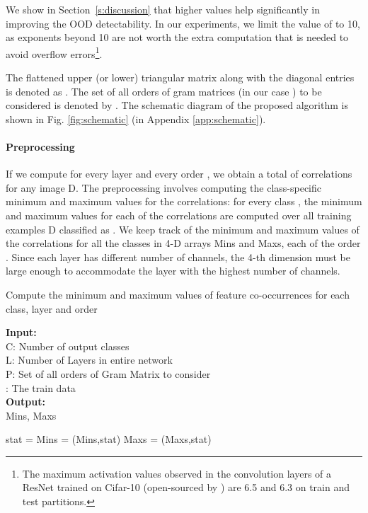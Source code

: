 \documentclass{article}
\begin{document}
We show in Section~\ref{s:discussion} that higher  values help significantly in improving the OOD detectability. In our experiments, we limit the value of  to 10, as exponents beyond 10 are not worth the extra computation that is needed to avoid overflow errors\footnote{The maximum activation values observed in the convolution layers of a ResNet trained on Cifar-10 (open-sourced by \cite{lee2018simple}) are 6.5 and 6.3 on train and test partitions.}.

The flattened upper (or lower) triangular matrix along with the diagonal entries is denoted as . The set of all orders of gram matrices (in our case ) to be considered is denoted by . The schematic diagram of the proposed algorithm is shown in Fig. \ref{fig:schematic} (in Appendix \ref{app:schematic}).



\paragraph{Preprocessing} If we compute  for every layer  and every order , we obtain a total of  correlations for any image D. The preprocessing involves computing the class-specific minimum and maximum values for the correlations: for every class , the minimum and maximum values for each of the  correlations are computed over all training examples D classified as . We keep track of the minimum and maximum values of the  correlations for all the classes in 4-D arrays Mins and Maxs, each of the order . Since each layer has different number of channels, the 4-th dimension must be large enough to accommodate the layer with the highest number of channels.

\begin{algorithm}[H]
\small
\caption{Compute the minimum and maximum values of feature co-occurrences for each class, layer and order}
\label{alg:compute_bounds}
\textbf{Input:} \\
    \phantom{hello} C: Number of output classes\\
    \phantom{hello} L: Number of Layers in entire network\\
    \phantom{hello} P: Set of all orders of Gram Matrix to consider\\
    \phantom{hello} : The train data\\
\textbf{Output:}\\
    \phantom{hello} Mins, Maxs

\begin{algorithmic}[1]
 
 

\State  {}
                \State stat =  
                \State Mins = (Mins,stat)
                \State Maxs = (Maxs,stat)
               \EndFor
            \EndFor
        \EndFor
    \EndFor
\EndFor
\State {}
\end{algorithmic}
\end{algorithm}
\end{document}
